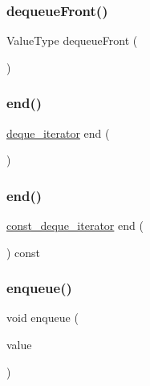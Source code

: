 \mbox{\label{classDeque_aecf002fe82a60407f6008f6fd7ac2c27}} 
\subsubsection{\texorpdfstring{dequeue\+Front()}{dequeueFront()}}
{\footnotesize\ttfamily Value\+Type dequeue\+Front (\begin{DoxyParamCaption}{ }\end{DoxyParamCaption})}

\mbox{\label{classDeque_a3f00605ada70bb4af841bafa03311f4a}} 
\subsubsection{\texorpdfstring{end()}{end()}\hspace{0.1cm}{\footnotesize\ttfamily [1/2]}}
{\footnotesize\ttfamily \mbox{\hyperlink{classDeque_1_1deque__iterator}{deque\+\_\+iterator}} end (\begin{DoxyParamCaption}{ }\end{DoxyParamCaption})\hspace{0.3cm}{\ttfamily [inline]}}

\mbox{\label{classDeque_a255e9712f118c564977def0bdb6438a2}} 
\subsubsection{\texorpdfstring{end()}{end()}\hspace{0.1cm}{\footnotesize\ttfamily [2/2]}}
{\footnotesize\ttfamily \mbox{\hyperlink{classDeque_1_1const__deque__iterator}{const\+\_\+deque\+\_\+iterator}} end (\begin{DoxyParamCaption}{ }\end{DoxyParamCaption}) const\hspace{0.3cm}{\ttfamily [inline]}}

\mbox{\label{classDeque_a663f69ed5d98f3f167202e9b2d7e7a9a}} 
\subsubsection{\texorpdfstring{enqueue()}{enqueue()}}
{\footnotesize\ttfamily void enqueue (\begin{DoxyParamCaption}\item[{const Value\+Type \&}]{value }\end{DoxyParamCaption})}

